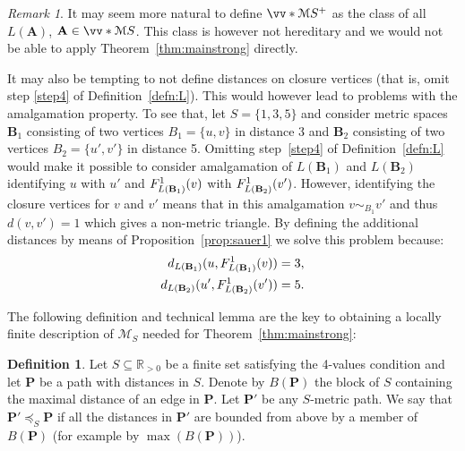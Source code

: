 \documentclass{elsarticle}
\def\ordclasssup#1#2{\vv*{#1}{#2}}
\def\str#1{\mathbf {#1}}
\def\nbfunc#1#2{F\ifstrempty{#1}{}{_{#1}}\ifstrempty{#2}{}{^{#2}}}
\theoremstyle{plain}
\theoremstyle{definition}
\newtheorem{definition}[theorem]{Definition}
\theoremstyle{remark}
\newtheorem*{remark}{Remark}
\begin{document}
\begin{remark}
It may seem more natural to define $\ordclasssup{\mathcal M}{S}^+$ as the class of all $L(\str{A})$, $\str{A}\in \ordclasssup{\mathcal M}{S}$.
This class is however not hereditary and we would not be able to apply Theorem~\ref{thm:mainstrong} directly.

It may also be tempting to not define distances on closure vertices (that is, omit step \ref{step4} of Definition~\ref{defn:L}).
This would however lead to problems with the amalgamation property.
To see that, let $S=\{1,3,5\}$ and consider metric spaces $\str{B}_1$ consisting of two vertices $B_1=\{u,v\}$ in distance 3
and $\str{B}_2$ consisting of two vertices $B_2=\{u',v'\}$ in distance 5.
Omitting step~\ref{step4} of Definition~\ref{defn:L} would make it possible to consider amalgamation of
$L(\str{B}_1)$ and $L(\str{B}_2)$ identifying $u$ with $u'$ and $\nbfunc{L(\str{B}_1)}{1}(v)$ with $\nbfunc{L(\str{B}_2)}{1}(v')$.
However, identifying the closure vertices for $v$ and $v'$ means that in this amalgamation $v\sim_{B_1} v'$ and thus $d(v,v')=1$ which gives a non-metric triangle.
By defining the additional distances by means of Proposition~\ref{prop:sauer1} we solve this problem because: 
\begin{align*}
d_{L(\str{B}_1)}(u, \nbfunc{L(\str{B}_1)}{1}(v))&=3,\\
d_{L(\str{B}_2)}(u', \nbfunc{L(\str{B}_2)}{1}(v'))&=5.
\end{align*}
\end{remark}

The following definition and technical lemma are the key to obtaining a locally finite
description of $\mathcal{M}_S$ needed for Theorem~\ref{thm:mainstrong}:

\begin{definition}
Let $S\subseteq \mathbb R_{>0}$ be a finite set satisfying the 4-values condition and
let $\str{P}$ be a path with distances in $S$. Denote by $B(\str{P})$ the block
of $S$ containing the maximal distance of an edge in $\str{P}$.
Let  $\str{P}'$ be any $S$-metric path.  We say that
$\str{P}'\preceq_S \str{P}$ if all the distances in $\str{P}'$ are
bounded from above by a member of $B(\str P)$ (for example by $\max(B(\str{P}))$).
\end{definition}
\end{document}
